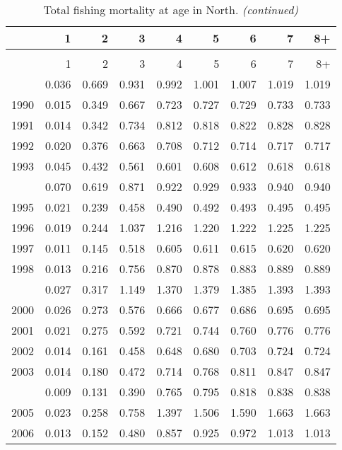 \documentclass[
]{article}
\begin{document}
\begin{longtable}[t]{lrrrrrrrr}
\caption{\label{tab:North-region-FAA-table}Total fishing mortality at age in North.}\\
\toprule
  & 1 & 2 & 3 & 4 & 5 & 6 & 7 & 8+\\
\midrule
\endfirsthead
\caption[]{Total fishing mortality at age in North. \textit{(continued)}}\\
\toprule
  & 1 & 2 & 3 & 4 & 5 & 6 & 7 & 8+\\
\midrule
\endhead

\endfoot
\bottomrule
\endlastfoot
1989 & 0.036 & 0.669 & 0.931 & 0.992 & 1.001 & 1.007 & 1.019 & 1.019\\
1990 & 0.015 & 0.349 & 0.667 & 0.723 & 0.727 & 0.729 & 0.733 & 0.733\\
1991 & 0.014 & 0.342 & 0.734 & 0.812 & 0.818 & 0.822 & 0.828 & 0.828\\
1992 & 0.020 & 0.376 & 0.663 & 0.708 & 0.712 & 0.714 & 0.717 & 0.717\\
1993 & 0.045 & 0.432 & 0.561 & 0.601 & 0.608 & 0.612 & 0.618 & 0.618\\
\addlinespace
1994 & 0.070 & 0.619 & 0.871 & 0.922 & 0.929 & 0.933 & 0.940 & 0.940\\
1995 & 0.021 & 0.239 & 0.458 & 0.490 & 0.492 & 0.493 & 0.495 & 0.495\\
1996 & 0.019 & 0.244 & 1.037 & 1.216 & 1.220 & 1.222 & 1.225 & 1.225\\
1997 & 0.011 & 0.145 & 0.518 & 0.605 & 0.611 & 0.615 & 0.620 & 0.620\\
1998 & 0.013 & 0.216 & 0.756 & 0.870 & 0.878 & 0.883 & 0.889 & 0.889\\
\addlinespace
1999 & 0.027 & 0.317 & 1.149 & 1.370 & 1.379 & 1.385 & 1.393 & 1.393\\
2000 & 0.026 & 0.273 & 0.576 & 0.666 & 0.677 & 0.686 & 0.695 & 0.695\\
2001 & 0.021 & 0.275 & 0.592 & 0.721 & 0.744 & 0.760 & 0.776 & 0.776\\
2002 & 0.014 & 0.161 & 0.458 & 0.648 & 0.680 & 0.703 & 0.724 & 0.724\\
2003 & 0.014 & 0.180 & 0.472 & 0.714 & 0.768 & 0.811 & 0.847 & 0.847\\
\addlinespace
2004 & 0.009 & 0.131 & 0.390 & 0.765 & 0.795 & 0.818 & 0.838 & 0.838\\
2005 & 0.023 & 0.258 & 0.758 & 1.397 & 1.506 & 1.590 & 1.663 & 1.663\\
2006 & 0.013 & 0.152 & 0.480 & 0.857 & 0.925 & 0.972 & 1.013 & 1.013\\

\end{longtable}
\end{document}
